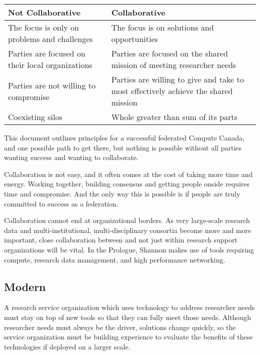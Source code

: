 \documentclass[11pt, letterpaper, twoside]{article}
\begin{document}
\begin{table}[ht] \centering \small {\sffamily
{}
\begin{tabular}{P{2.5in}|P{2.5in}}
\textcolor{cdaRed}{\textbf{Not Collaborative}} & \textcolor{cdaRed}{\textbf{Collaborative}} \\
\hline
\hline 
The focus is only on problems and challenges & The focus is on solutions and opportunities \\
Parties are focused on their local organizations & Parties are focused on the shared mission of meeting researcher needs \\
Parties are not willing to compromise & Parties are willing to give and take to most effectively achieve the shared mission \\
Coexisting silos & Whole greater than sum of its parts \\
\hline
\end{tabular}
}
\end{table}


This document outlines principles for a successful federated Compute
Canada, and one possible path to get there, but nothing is possible
without all parties wanting success and wanting to collaborate.


Collaboration is not easy, and it often comes at the cost of taking more
time and energy. Working together, building consensus and getting people
onside requires time and compromise. And the only way this is possible
is if people are truly committed to success as a federation.

Collaboration cannot end at organizational borders. As very large-scale
research data and multi-institutional, multi-disciplinary consortia
become more and more important, close collaboration between and not just
within research support organizations will be vital. In the Prologue,
Shannon makes use of tools requiring compute, research data management,
and high performance networking.

\subsection*{Modern}
%

A research service organization which uses technology to address
researcher needs must stay on top of new tools so that they can fully
meet those needs. Although researcher needs must always be the driver,
solutions change quickly, so the service organization must be building
experience to evaluate the benefits of these technologies if deployed on
a larger scale.
\end{document}

